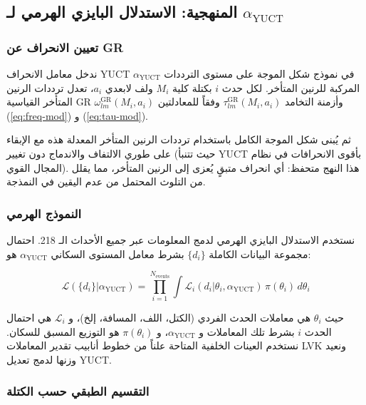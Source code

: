 \documentclass[11pt,a4paper]{article}
\theoremstyle{remark}
\begin{document}
	\subsection{المنهجية: الاستدلال البايزي الهرمي لـ $\alpha_{\text{YUCT}}$}
	
	\subsubsection{تعيين الانحراف عن GR}
	
	ندخل معامل الانحراف YUCT $\alpha_{\text{YUCT}}$ في نموذج شكل الموجة على مستوى الترددات المركبة للرنين المتأخر. لكل حدث $i$ بكتلة كلية $M_i$ ولف لابعدي $a_i$، تعدل ترددات الرنين المتأخر القياسية GR $\omega_{lm}^{\text{GR}}(M_i, a_i)$ وأزمنة التخامد $\tau_{lm}^{\text{GR}}(M_i, a_i)$ وفقاً للمعادلتين (\ref{eq:freq-mod}) و (\ref{eq:tau-mod}).
	
	ثم يُبنى شكل الموجة الكامل باستخدام ترددات الرنين المتأخر المعدلة هذه مع الإبقاء على طوري الالتفاف والاندماج دون تغيير (حيث تتنبأ YUCT بأقوى الانحرافات في نظام المجال القوي). هذا النهج متحفظ: أي انحراف متبقٍ يُعزى إلى الرنين المتأخر، مما يقلل من التلوث المحتمل من عدم اليقين في النمذجة.
	
	\subsubsection{النموذج الهرمي}
	
	نستخدم الاستدلال البايزي الهرمي لدمج المعلومات عبر جميع الأحداث الـ 218. احتمال مجموعة البيانات الكاملة $\{d_i\}$ بشرط معامل المستوى السكاني $\alpha_{\text{YUCT}}$ هو:
	
	\begin{equation}
		\mathcal{L}(\{d_i\} | \alpha_{\text{YUCT}}) = \prod_{i=1}^{N_{\text{events}}} \int \mathcal{L}_i(d_i | \theta_i, \alpha_{\text{YUCT}}) \, \pi(\theta_i) \, d\theta_i
		\label{eq:hierarchical}
	\end{equation}
	
	حيث $\theta_i$ هي معاملات الحدث الفردي (الكتل، اللف، المسافة، إلخ)، و $\mathcal{L}_i$ هي احتمال الحدث $i$ بشرط تلك المعاملات و $\alpha_{\text{YUCT}}$، و $\pi(\theta_i)$ هو التوزيع المسبق للسكان. نستخدم العينات الخلفية المتاحة علناً من خطوط أنابيب تقدير المعاملات LVK ونعيد وزنها لدمج تعديل YUCT.
	
	\subsubsection{التقسيم الطبقي حسب الكتلة}
	
\end{document}

